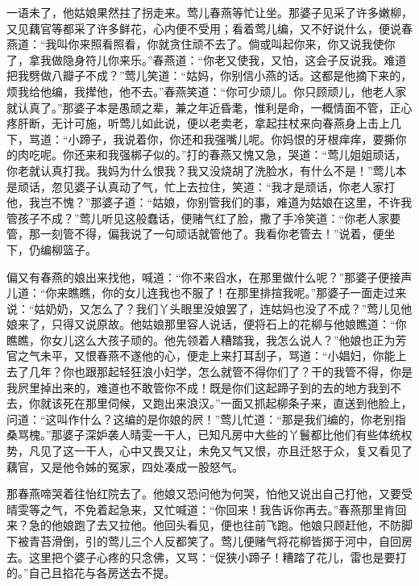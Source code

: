 一语未了，他姑娘果然拄了拐走来。莺儿春燕等忙让坐。那婆子见采了许多嫩柳，又见藕官等都采了许多鲜花，心内便不受用；看着莺儿编，又不好说什么，便说春燕道：“我叫你来照看照看，你就贪住顽不去了。倘或叫起你来，你又说我使你了，拿我做隐身符儿你来乐。”春燕道：“你老又使我，又怕，这会子反说我。难道把我劈做八瓣子不成？”莺儿笑道：“姑妈，你别信小燕的话。这都是他摘下来的，烦我给他编，我撵他，他不去。”春燕笑道：“你可少顽儿。你只顾顽儿，他老人家就认真了。”那婆子本是愚顽之辈，兼之年近昏耄，惟利是命，一概情面不管，正心疼肝断，无计可施，听莺儿如此说，便以老卖老，拿起拄杖来向春燕身上击上几下，骂道：“小蹄子，我说着你，你还和我强嘴儿呢。你妈恨的牙根痒痒，要撕你的肉吃呢。你还来和我强梆子似的。”打的春燕又愧又急，哭道：“莺儿姐姐顽话，你老就认真打我。我妈为什么恨我？我又没烧胡了洗脸水，有什么不是！”莺儿本是顽话，忽见婆子认真动了气，忙上去拉住，笑道：“我才是顽话，你老人家打他，我岂不愧？”那婆子道：“姑娘，你别管我们的事，难道为姑娘在这里，不许我管孩子不成？”莺儿听见这般蠢话，便赌气红了脸，撒了手冷笑道：“你老人家要管，那一刻管不得，偏我说了一句顽话就管他了。我看你老管去！”说着，便坐下，仍编柳篮子。

偏又有春燕的娘出来找他，喊道：“你不来舀水，在那里做什么呢？”那婆子便接声儿道：“你来瞧瞧，你的女儿连我也不服了！在那里排揎我呢。”那婆子一面走过来说：“姑奶奶，又怎么了？我们丫头眼里没娘罢了，连姑妈也没了不成？”莺儿见他娘来了，只得又说原故。他姑娘那里容人说话，便将石上的花柳与他娘瞧道：“你瞧瞧，你女儿这么大孩子顽的。他先领着人糟踏我，我怎么说人？”他娘也正为芳官之气未平，又恨春燕不遂他的心，便走上来打耳刮子，骂道：“小娼妇，你能上去了几年？你也跟那起轻狂浪小妇学，怎么就管不得你们了？干的我管不得，你是我屄里掉出来的，难道也不敢管你不成！既是你们这起蹄子到的去的地方我到不去，你就该死在那里伺候，又跑出来浪汉。”一面又抓起柳条子来，直送到他脸上，问道：“这叫作什么？这编的是你娘的屄！”莺儿忙道：“那是我们编的，你老别指桑骂槐。”那婆子深妒袭人晴雯一干人，已知凡房中大些的丫鬟都比他们有些体统权势，凡见了这一干人，心中又畏又让，未免又气又恨，亦且迁怒于众，复又看见了藕官，又是他令姊的冤家，四处凑成一股怒气。

那春燕啼哭着往怡红院去了。他娘又恐问他为何哭，怕他又说出自己打他，又要受晴雯等之气，不免着起急来，又忙喊道：“你回来！我告诉你再去。”春燕那里肯回来？急的他娘跑了去又拉他。他回头看见，便也往前飞跑。他娘只顾赶他，不防脚下被青苔滑倒，引的莺儿三个人反都笑了。莺儿便赌气将花柳皆掷于河中，自回房去。这里把个婆子心疼的只念佛，又骂：“促狭小蹄子！糟踏了花儿，雷也是要打的。”自己且掐花与各房送去不提。

